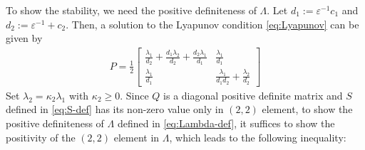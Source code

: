\documentclass[letterpaper, 10 pt, conference]{cls/ieeeconf}
\theoremstyle{definition}
\newcommand{\ep}{\varepsilon}
\begin{document}
To show the stability, we need the positive definiteness of $\Lambda $. Let $d_1 := \ep^{-1} c_1$ and $d_2 := \ep^{-1} + c_2$. Then, a solution to the Lyapunov condition \eqref{eq:Lyapunov} can be given by 
\begin{align}
P = \frac{1}{2} \begin{bmatrix} 
\frac{\lambda_1}{ d_2} + \frac{d_1 \lambda_2}{ d_2} + \frac{d_2 \lambda_1}{ d_1} & \frac{\lambda_1}{ d_1} \\[10pt]
\frac{\lambda_1}{ d_1} & \frac{\lambda_1}{ d_1 d_2} + \frac{\lambda_2}{ d_2}
\end{bmatrix}    
\end{align}
Set $\lambda_2 = \kappa_2 \lambda_1$ with $\kappa_2 \geq 0$. 
Since $Q$ is a diagonal positive definite matrix and $S$ defined in \eqref{eq:S-def} has its non-zero value only in $(2,2)$ element, to show the positive definiteness of $\Lambda$ defined in \eqref{eq:Lambda-def}, it suffices to show the positivity of the $(2,2)$ element in $\Lambda$, which leads to the following inequality:  
\end{document}
